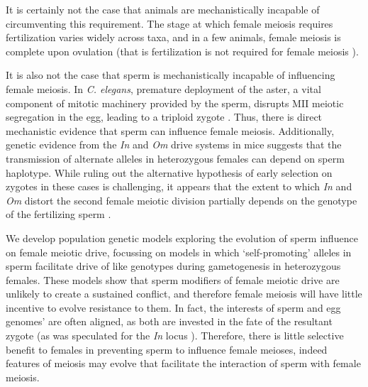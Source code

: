 \documentclass[12pt,letterpaper]{article}
\begin{document}
It is certainly not the case that animals are mechanistically incapable of circumventing this requirement.
The stage at which female meiosis requires fertilization varies widely across taxa, and in a few animals, 
	female meiosis is complete upon ovulation (that is fertilization is not required for female meiosis \citep[see table 1 of ref 
][]{Masui_book}). 

It is also not the case that sperm is mechanistically incapable of influencing female meiosis.
In \emph{C. elegans}, premature deployment of the aster, a vital component of mitotic
machinery provided by the sperm, disrupts MII meiotic segregation
in the egg, leading to a triploid zygote \citep{McNally2012}. 
Thus, there is direct mechanistic evidence that sperm can influence female meiosis.
 Additionally, genetic evidence from the \emph{In} and \emph{Om}  drive systems in mice suggests that the 
 transmission of alternate alleles in heterozygous females can depend on sperm haplotype.  
 While ruling out the alternative hypothesis of early selection on zygotes \citep[pages
52-54][]{Burt2006} in these cases is challenging, it appears that the extent to which \emph{In} and \emph{Om} distort the second female meiotic division partially depends on the genotype of the fertilizing sperm \citep{Agulnik1993,Wu2005}.  


We develop population genetic models exploring the evolution of sperm influence on female meiotic drive, focussing on models in which `self-promoting' alleles in sperm facilitate drive of like genotypes during gametogenesis in heterozygous females.  
These models show that sperm modifiers of female meiotic drive are
unlikely to create a sustained conflict, and therefore 
female meiosis will have little incentive to evolve resistance to them.
In fact, the interests of sperm and egg  genomes' are often aligned, as both are invested in the fate of the resultant zygote (as was speculated for the \emph{In} locus \citep{Pomiankowski1993}).
Therefore, there is little selective benefit to females in preventing sperm to influence female meioses,
	indeed features of meiosis may evolve that facilitate the interaction of sperm with female meiosis. 
\end{document}
